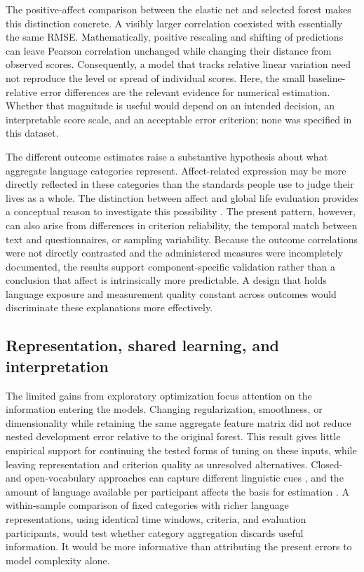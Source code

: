 The positive-affect comparison between the elastic net and selected forest makes this distinction concrete. A visibly larger correlation coexisted with essentially the same RMSE. Mathematically, positive rescaling and shifting of predictions can leave Pearson correlation unchanged while changing their distance from observed scores. Consequently, a model that tracks relative linear variation need not reproduce the level or spread of individual scores. Here, the small baseline-relative error differences are the relevant evidence for numerical estimation. Whether that magnitude is useful would depend on an intended decision, an interpretable score scale, and an acceptable error criterion; none was specified in this dataset.

The different outcome estimates raise a substantive hypothesis about what aggregate language categories represent. Affect-related expression may be more directly reflected in these categories than the standards people use to judge their lives as a whole. The distinction between affect and global life evaluation provides a conceptual reason to investigate this possibility \citep{diener1984,diener1985}. The present pattern, however, can also arise from differences in criterion reliability, the temporal match between text and questionnaires, or sampling variability. Because the outcome correlations were not directly contrasted and the administered measures were incompletely documented, the results support component-specific validation rather than a conclusion that affect is intrinsically more predictable. A design that holds language exposure and measurement quality constant across outcomes would discriminate these explanations more effectively.

\subsection{Representation, shared learning, and interpretation}
The limited gains from exploratory optimization focus attention on the information entering the models. Changing regularization, smoothness, or dimensionality while retaining the same aggregate feature matrix did not reduce nested development error relative to the original forest. This result gives little empirical support for continuing the tested forms of tuning on these inputs, while leaving representation and criterion quality as unresolved alternatives. Closed- and open-vocabulary approaches can capture different linguistic cues \citep{eichstaedt2021}, and the amount of language available per participant affects the basis for estimation \citep{kern2016}. A within-sample comparison of fixed categories with richer language representations, using identical time windows, criteria, and evaluation participants, would test whether category aggregation discards useful information. It would be more informative than attributing the present errors to model complexity alone.

